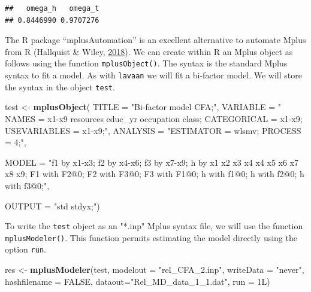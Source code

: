 \documentclass[]{book}
\newenvironment{Shaded}{\begin{snugshade}}{\end{snugshade}}
\newcommand{\DataTypeTok}[1]{\textcolor[rgb]{0.13,0.29,0.53}{#1}}
\newcommand{\KeywordTok}[1]{\textcolor[rgb]{0.13,0.29,0.53}{\textbf{#1}}}
\newcommand{\NormalTok}[1]{#1}
\newcommand{\OtherTok}[1]{\textcolor[rgb]{0.56,0.35,0.01}{#1}}
\newcommand{\StringTok}[1]{\textcolor[rgb]{0.31,0.60,0.02}{#1}}
\begin{document}
\begin{verbatim}
##   omega_h   omega_t 
## 0.8446990 0.9707276
\end{verbatim}

The R package ``mplusAutomation'' is an excellent alternative to automate Mplus from R (Hallquist \& Wiley, \protect\hyperlink{ref-Hallquist2018}{2018}). We can create within R an Mplus object as follows using the function \texttt{mplusObject()}. The syntax is the standard Mplus syntax to fit a model. As with \texttt{lavaan} we will fit a bi-factor model. We will store the syntax in the object \texttt{test}.

\begin{Shaded}
\begin{Highlighting}[]
\NormalTok{test <-}\StringTok{ }\KeywordTok{mplusObject}\NormalTok{(}
\DataTypeTok{TITLE =} \StringTok{"Bi-factor model CFA;"}\NormalTok{,}
   \DataTypeTok{VARIABLE =} \StringTok{"}
\StringTok{     NAMES = x1-x9 resources educ_yr occupation class;}
\StringTok{     CATEGORICAL = x1-x9;}
\StringTok{     USEVARIABLES = x1-x9;"}\NormalTok{,}
   \DataTypeTok{ANALYSIS =} \StringTok{"ESTIMATOR = wlsmv;}
\StringTok{              PROCESS = 4;"}\NormalTok{,}

\DataTypeTok{MODEL =} \StringTok{"f1 by x1-x3;}
\StringTok{  f2 by x4-x6;}
\StringTok{  f3 by x7-x9;}
\StringTok{  h by x1 x2 x3 x4 x4 x5 x6 x7 x8 x9;}
\StringTok{  F1 with F2@0;}
\StringTok{  F2 with F3@0;}
\StringTok{  F3 with F1@0;}
\StringTok{  h with f1@0;}
\StringTok{  h with f2@0;}
\StringTok{  h with f3@0;"}\NormalTok{,}

\DataTypeTok{OUTPUT =} \StringTok{"std stdyx;"}\NormalTok{)}
\end{Highlighting}
\end{Shaded}

To write the \texttt{test} object as an "*.inp" Mplus syntax file, we will use the function \texttt{mplusModeler()}. This function permits estimating the model directly using the option \texttt{run}.

\begin{Shaded}
\begin{Highlighting}[]
\NormalTok{res <-}\StringTok{ }\KeywordTok{mplusModeler}\NormalTok{(test, }\DataTypeTok{modelout =} \StringTok{"rel_CFA_2.inp"}\NormalTok{, }
                    \DataTypeTok{writeData =} \StringTok{"never"}\NormalTok{, }\DataTypeTok{hashfilename =} \OtherTok{FALSE}\NormalTok{, }
                    \DataTypeTok{dataout=}\StringTok{"Rel_MD_data_1_1.dat"}\NormalTok{, }\DataTypeTok{run =}\NormalTok{ 1L)}
\end{Highlighting}
\end{Shaded}
\end{document}
